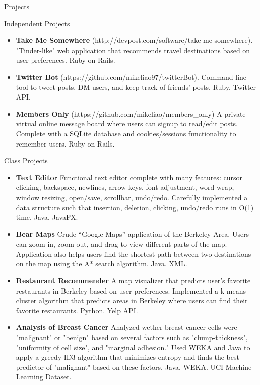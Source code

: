 \documentclass[]{mcdowellcv}
\begin{document}
	\begin{cvsection}{Projects}
		\begin{cvsubsection}{Independent Projects}{}{}
			\begin{itemize}
				\item \textbf{Take Me Somewhere} (http://devpost.com/software/take-me-somewhere). "Tinder-like" web application that recommends travel destinations based on user preferences. Ruby on Rails. 
				\item \textbf{Twitter Bot} (https://github.com/mikeliao97/twitterBot). Command-line tool to tweet posts, DM users, and keep track of friends' posts. Ruby. Twitter API.
				\item \textbf{Members Only} (https://github.com/mikeliao/members\_only) A private virtual online message board where users can signup to read/edit posts. Complete with a SQLite database and cookies/sessions functionality to remember users. Ruby on Rails. 
			\end{itemize}
		\end{cvsubsection}
		\begin{cvsubsection}{Class Projects}{}{}
			\begin{itemize}
				\item \textbf{Text Editor} Functional text editor complete with many features: cursor clicking, backspace, newlines, arrow keys, font adjustment, word wrap, window resizing, open/save, scrollbar, undo/redo. Carefully implemented a data structure such that insertion, deletion, clicking, undo/redo runs in O(1) time. Java. JavaFX.
				\item \textbf{Bear Maps}  Crude ``Google-Maps'' application of the Berkeley Area. Users can zoom-in, zoom-out, and drag to view different parts of the map. Application also helps users find the shortest path between two destinations on the map using the A* search algorithm. Java. XML.
				\item \textbf{Restaurant Recommender} A map visualizer that predicts user's favorite restaurants in Berkeley based on user preferences. Implemented a k-means cluster algorithm that predicts areas in Berkeley where users can find their favorite restaurants. Python. Yelp API. 
				\item \textbf{Analysis of Breast Cancer}  Analyzed wether breast cancer cells were "malignant" or "benign" based on several factors such as "clump-thickness", "uniformity of cell size", and "marginal adhesion." Used WEKA and Java to apply a greedy ID3 algorithm that minimizes entropy and finds the best predictor of "malignant" based on these factors. Java. WEKA. UCI Machine Learning Dataset.
			\end{itemize}
		\end{cvsubsection}
		
	\end{cvsection}
	
\end{document}
